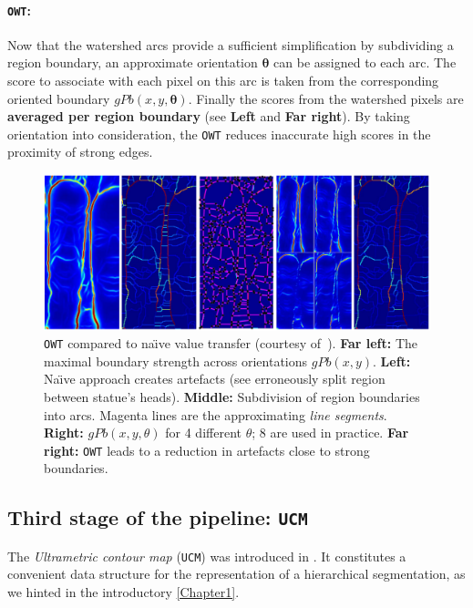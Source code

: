 \paragraph{{\tt OWT}:}
Now that the watershed arcs provide a sufficient simplification by subdividing a region boundary, an approximate orientation $\mathbf\theta$ can be assigned to each arc. The score to associate with each pixel on this arc is taken from the corresponding oriented boundary $gPb(x,y,\mathbf{\theta})$. Finally the scores from the watershed pixels are {\bf averaged per region boundary} (see  {\bf Left} and {\bf Far right}). 
By taking orientation into consideration, the {\tt OWT} reduces inaccurate high scores in the proximity of strong edges.

\begin{figure}[t]
 \centering
 \includegraphics[width=1\textwidth]{images/gPb-OWT-UCM/OWT_Arbelaez11.png}
 \caption[{\tt OWT} compared to na\"{\i}ve value transfer]{{\tt OWT} compared to na\"{\i}ve value transfer (courtesy of~\cite{Arbelaez11}). {\bf Far left:} The maximal boundary strength across orientations $gPb(x,y)$. {\bf Left:} Na\"{\i}ve approach creates artefacts (see erroneously split region between statue's heads). {\bf Middle:} Subdivision of region boundaries into arcs. Magenta lines are the approximating {\it line segments}. {\bf Right:} $gPb(x,y,\theta)$ for 4 different $\theta$; 8 are used in practice. {\bf Far right:} {\tt OWT} leads to a reduction in artefacts close to strong boundaries.}
 \label{fig:OWT_Arbelaez11}
\end{figure}


\subsection{Third stage of the pipeline: {\tt UCM}}
\label{sec:ch3-UCM}
The {\it Ultrametric contour map} ({\tt UCM}) was introduced in \cite{Arbelaez2006boundary}. It constitutes a convenient data structure for the representation of a hierarchical segmentation, as we hinted in the introductory \cref{Chapter1}. 

